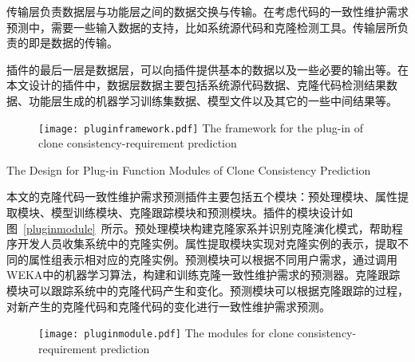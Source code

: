 传输层负责数据层与功能层之间的数据交换与传输。在考虑代码的一致性维护需求预测中，需要一些输入数据的支持，比如系统源代码和克隆检测工具。传输层所负责的即是数据的传输。

插件的最后一层是数据层，可以向插件提供基本的数据以及一些必要的输出等。在本文设计的插件中，数据层数据主要包括系统源代码数据、克隆代码检测结果数据、功能层生成的机器学习训练集数据、模型文件以及其它的一些中间结果等。

\begin{figure}[htbp]
\centering
\texttt{[image: pluginframework.pdf]}
{The framework for the plug-in of clone consistency-requirement prediction}
\vspace{-1em}
\end{figure}

{The Design for Plug-in Function Modules of Clone Consistency Prediction}

本文的克隆代码一致性维护需求预测插件主要包括五个模块：预处理模块、属性提取模块、模型训练模块、克隆跟踪模块和预测模块。插件的模块设计如图~\ref{pluginmodule}~所示。预处理模块构建克隆家系并识别克隆演化模式，帮助程序开发人员收集系统中的克隆实例。属性提取模块实现对克隆实例的表示，提取不同的属性组表示相对应的克隆实例。预测模块可以根据不同用户需求，通过调用WEKA中的机器学习算法，构建和训练克隆一致性维护需求的预测器。克隆跟踪模块可以跟踪系统中的克隆代码产生和变化。预测模块可以根据克隆跟踪的过程，对新产生的克隆代码和克隆代码的变化进行一致性维护需求预测。

\begin{figure}[htbp]
\centering
\texttt{[image: pluginmodule.pdf]}
{The modules for clone consistency-requirement prediction}
\vspace{-1em}
\end{figure}


